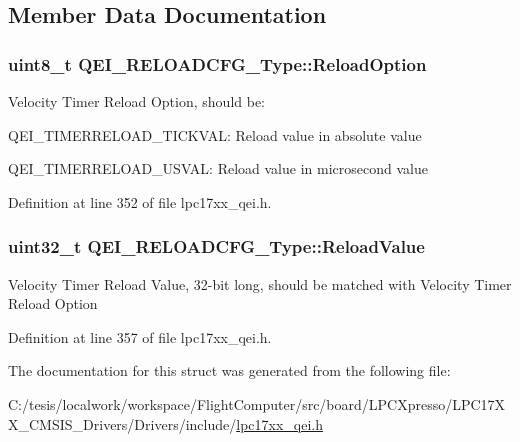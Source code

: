 \subsection{\-Member \-Data \-Documentation}
\hypertarget{struct_q_e_i___r_e_l_o_a_d_c_f_g___type_a316562ce9dc94c6c32a872d51cf1ff8f}{
\subsubsection[{\-Reload\-Option}]{\setlength{\rightskip}{0pt plus 5cm}uint8\-\_\-t {\bf \-Q\-E\-I\-\_\-\-R\-E\-L\-O\-A\-D\-C\-F\-G\-\_\-\-Type\-::\-Reload\-Option}}}\label{struct_q_e_i___r_e_l_o_a_d_c_f_g___type_a316562ce9dc94c6c32a872d51cf1ff8f}
\-Velocity \-Timer \-Reload \-Option, should be\-:
\begin{DoxyItemize}
\item \-Q\-E\-I\-\_\-\-T\-I\-M\-E\-R\-R\-E\-L\-O\-A\-D\-\_\-\-T\-I\-C\-K\-V\-A\-L\-: \-Reload value in absolute value
\item \-Q\-E\-I\-\_\-\-T\-I\-M\-E\-R\-R\-E\-L\-O\-A\-D\-\_\-\-U\-S\-V\-A\-L\-: \-Reload value in microsecond value 
\end{DoxyItemize}

\-Definition at line 352 of file lpc17xx\-\_\-qei.\-h.

\hypertarget{struct_q_e_i___r_e_l_o_a_d_c_f_g___type_a0c2ce04ffde5366bd42e73cf7136a2f1}{
\subsubsection[{\-Reload\-Value}]{\setlength{\rightskip}{0pt plus 5cm}uint32\-\_\-t {\bf \-Q\-E\-I\-\_\-\-R\-E\-L\-O\-A\-D\-C\-F\-G\-\_\-\-Type\-::\-Reload\-Value}}}\label{struct_q_e_i___r_e_l_o_a_d_c_f_g___type_a0c2ce04ffde5366bd42e73cf7136a2f1}
\-Velocity \-Timer \-Reload \-Value, 32-\/bit long, should be matched with \-Velocity \-Timer \-Reload \-Option 

\-Definition at line 357 of file lpc17xx\-\_\-qei.\-h.



\-The documentation for this struct was generated from the following file\-:\begin{DoxyCompactItemize}
\item 
\-C\-:/tesis/localwork/workspace/\-Flight\-Computer/src/board/\-L\-P\-C\-Xpresso/\-L\-P\-C17\-X\-X\-\_\-\-C\-M\-S\-I\-S\-\_\-\-Drivers/\-Drivers/include/\hyperlink{lpc17xx__qei_8h}{lpc17xx\-\_\-qei.\-h}\end{DoxyCompactItemize}
